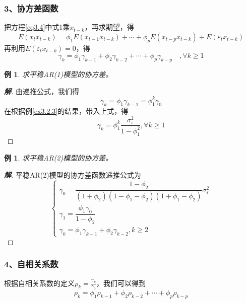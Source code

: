 \documentclass[12pt, a4paper, oneside]{ctexbook}
\newtheorem{example}[theorem]{例}
\newcommand\jie[2]{\begin{proof}[\textbf{#1}]
    #2
\end{proof}}
\begin{document}
\subsubsection{3、协方差函数}
把方程\ref{eq3.4}中式1乘$x_{t-k}$，再求期望，得
\begin{equation*}
    E(x_tx_{t-k})=\phi_1E(x_{t-1}x_{t-k})+\cdots+\phi_pE(x_{t-p}x_{t-k})+E(\varepsilon_tx_{t-k})
\end{equation*}
再利用$E(\varepsilon_tx_{t-k})=0$，得
\begin{equation}
    \gamma_k=\phi_1\gamma_{k-1}+\phi_2\gamma_{k-2}+\cdots+\phi_p\gamma_{k-p}\quad,\forall k\geq1
\end{equation}

\begin{example}
    求平稳AR(1)模型的协方差。
\end{example}
\jie{解}{
    由递推公式，我们得
    \begin{equation*}
        \gamma_k=\phi_1\gamma_{k-1}=\phi_1^k\gamma_{0}
    \end{equation*}
    在根据例\ref{ex3.2.3}的结果，带入上式，得
    \begin{equation*}
        \gamma_k=\phi_{1}^k\frac{\sigma_{\varepsilon}^{2}}{1-\phi_{1}^{2}},
        \forall k\geq1
    \end{equation*}
}

\begin{example}
    求平稳AR(2)模型的协方差。
\end{example}
\jie{解}{
    平稳AR(2)模型的协方差函数递推公式为
    \begin{equation*}
        \begin{cases}
            \gamma_0=\dfrac{1-\phi_2}{(1+\phi_2)(1-\phi_1-\phi_2)(1+\phi_1-\phi_2)}\sigma_\varepsilon^2 \\
            \gamma_1=\dfrac{\phi_1\gamma_0}{1-\phi_2}                                                   \\
            \gamma_k=\phi_1\gamma_{k-1}+\phi_2\gamma_{k-2},k\geq2
        \end{cases}
    \end{equation*}
}


\subsubsection{4、自相关系数}
根据自相关系数的定义$\rho_k=\frac{\gamma_k}{\gamma_0}$，我们可以得到
\begin{equation}
    \rho_k=\phi_1\rho_{k-1}+\phi_2\rho_{k-2}+\cdots+\phi_p\rho_{k-p}
\end{equation}
\end{document}
